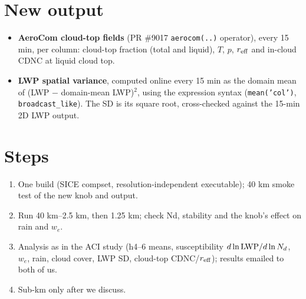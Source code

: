 \documentclass[10pt]{article}
\begin{document}
\section*{New output}
\begin{itemize}
\item \textbf{AeroCom cloud-top fields} (PR \#9017 \texttt{aerocom(..)} operator), every 15 min, per column:
cloud-top fraction (total and liquid), $T$, $p$, $r_{\rm eff}$ and in-cloud CDNC at liquid cloud top.
\item \textbf{LWP spatial variance}, computed online every 15 min as the domain mean of
(LWP $-$ domain-mean LWP)$^2$, using the expression syntax (\texttt{mean('col')}, \texttt{broadcast\_like}).
The SD is its square root, cross-checked against the 15-min 2D LWP output.
\end{itemize}

\section*{Steps}
\begin{enumerate}
\item One build (SICE compset, resolution-independent executable); 40 km smoke test of the new knob and output.
\item Run 40 km--2.5 km, then 1.25 km; check Nd, stability and the knob's effect on rain and $w_e$.
\item Analysis as in the ACI study (h4--6 means, susceptibility $d\ln{\rm LWP}/d\ln N_d$, $w_e$, rain, cloud cover,
LWP SD, cloud-top CDNC/$r_{\rm eff}$); results emailed to both of us.
\item Sub-km only after we discuss.
\end{enumerate}
\end{document}
